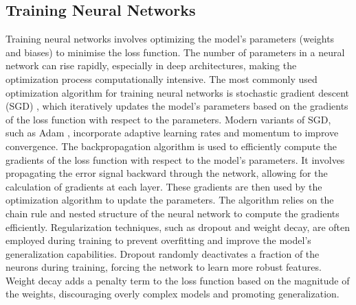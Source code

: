 \subsection{Training Neural Networks}
Training neural networks involves optimizing the model's parameters (weights and biases) to minimise the loss function. The number of parameters in a neural network can rise rapidly, especially in deep architectures, making the optimization process computationally intensive. The most commonly used optimization algorithm for training neural networks is stochastic gradient descent (SGD) \cite{sgd}, which iteratively updates the model's parameters based on the gradients of the loss function with respect to the parameters. Modern variants of SGD, such as Adam \cite{adam}, incorporate adaptive learning rates and momentum to improve convergence.
The backpropagation algorithm \cite{backpropagation} is used to efficiently compute the gradients of the loss function with respect to the model's parameters. It involves propagating the error signal backward through the network, allowing for the calculation of gradients at each layer. These gradients are then used by the optimization algorithm to update the parameters. The algorithm relies on the chain rule and nested structure of the neural network to compute the gradients efficiently.
Regularization techniques, such as dropout \cite{dropout} and weight decay, are often employed during training to prevent overfitting and improve the model's generalization capabilities. Dropout randomly deactivates a fraction of the neurons during training, forcing the network to learn more robust features. Weight decay \cite{adamW} adds a penalty term to the loss function based on the magnitude of the weights, discouraging overly complex models and promoting generalization.